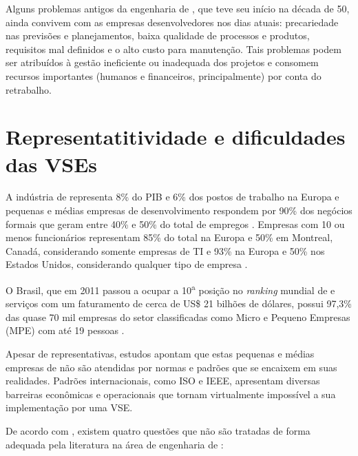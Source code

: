 Alguns problemas antigos da engenharia de \sw, que teve seu início na década de 50, ainda convivem com as empresas desenvolvedores nos dias atuais: precariedade  nas  previsões  e  planejamentos, baixa qualidade de processos e produtos, requisitos  mal  definidos e o alto custo para manutenção. Tais problemas podem ser atribuídos à gestão ineficiente ou inadequada dos projetos e consomem recursos importantes (humanos e financeiros, principalmente) por conta do retrabalho.

\section{Representatitividade e dificuldades das VSEs}

A indústria de \sw representa 8\% do PIB e 6\% dos postos de trabalho na Europa e pequenas e médias empresas de desenvolvimento respondem por 90\% dos negócios formais que geram entre 40\% e 50\% do total de empregos \citep{reicis}. Empresas com 10 ou menos funcionários representam 85\% do total na Europa e 50\% em Montreal, Canadá, considerando somente empresas de TI e 93\% na Europa e 50\% nos Estados Unidos, considerando qualquer tipo de empresa \citep{ieee_comp}. 

O Brasil, que em 2011 passou a ocupar a 10\textsuperscript{a} posição no \textit{ranking} mundial de \sw e serviços com um faturamento de cerca de US\$ 21 bilhões de dólares, possui 97,3\% das quase 70 mil empresas do setor classificadas como Micro e Pequeno Empresas (MPE) com até 19 pessoas \citep{guia.sebrae}.

Apesar de representativas, estudos apontam que estas pequenas e médias empresas de \sw não são atendidas por normas e padrões que se encaixem em suas realidades. Padrões internacionais, como ISO e IEEE, apresentam diversas barreiras econômicas e operacionais que tornam virtualmente impossível a sua implementação por uma VSE.

De acordo com \cite{fayad}, existem quatro questões que não são tratadas de forma adequada pela literatura na área de engenharia de \sw:

